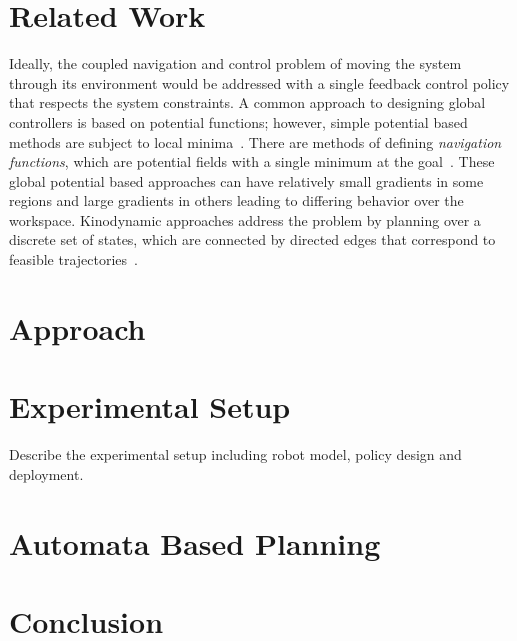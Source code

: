 \documentclass[journal,twoside]{IEEEtran}
\begin{document}
\section{Related Work}

Ideally, the coupled navigation and control problem of moving the
system through its environment would be addressed with a single
feedback control policy that respects the system constraints.  A
common approach to designing global controllers is based on potential
functions; however, simple potential based methods are subject to
local minima~\cite{kod_87}.  There are methods of defining
\emph{navigation functions}, which are potential fields with a single
minimum at the goal~\cite{rim_kod_92,con_grup_93}.  These global
potential based approaches can have relatively small gradients in some
regions and large gradients in others leading to differing behavior
over the workspace.  Kinodynamic approaches address the problem by
planning over a discrete set of states, which are connected by directed edges
that correspond to feasible trajectories~\cite{donald_93}.

\section{Approach}
\label{sec:approach}



\section{Experimental Setup}
\label{sec:setup}

{\large  Describe the experimental setup including robot model, policy design and deployment.}



\section{Automata Based Planning}
\label{sec:planning_detailed}



\section{Conclusion}
\label{sec:concl}
 


\appendices
\end{document}
